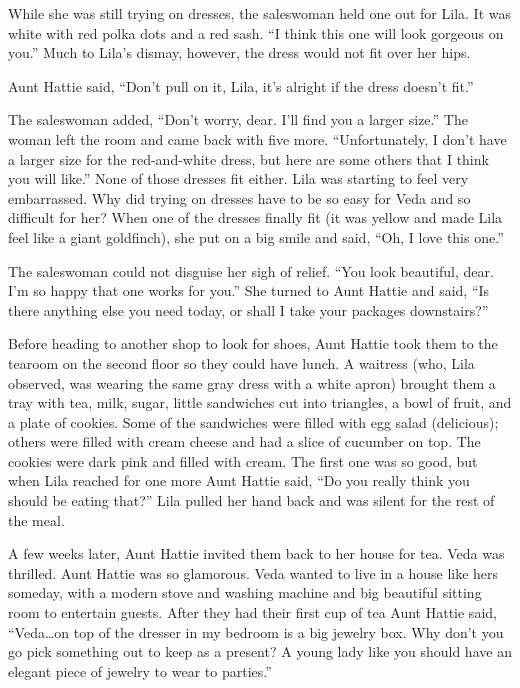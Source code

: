 \documentclass[
  american,
  letterpaper,
]{book}
\begin{document}
While she was still trying on dresses, the saleswoman held one out for
Lila. It was white with red polka dots and a red sash. ``I think this
one will look gorgeous on you.'' Much to Lila's dismay, however, the
dress would not fit over her hips.

Aunt Hattie said, ``Don't pull on it, Lila, it's alright if the dress
doesn't fit.''

The saleswoman added, ``Don't worry, dear. I'll find you a larger
size.'' The woman left the room and came back with five more.
``Unfortunately, I don't have a larger size for the red-and-white dress,
but here are some others that I think you will like.'' None of those
dresses fit either. Lila was starting to feel very embarrassed. Why did
trying on dresses have to be so easy for Veda and so difficult for her?
When one of the dresses finally fit (it was yellow and made Lila feel
like a giant goldfinch), she put on a big smile and said, ``Oh, I love
this one.''

The saleswoman could not disguise her sigh of relief. ``You look
beautiful, dear. I'm so happy that one works for you.'' She turned to
Aunt Hattie and said, ``Is there anything else you need today, or shall
I take your packages downstairs?''

Before heading to another shop to look for shoes, Aunt Hattie took them
to the tearoom on the second floor so they could have lunch. A waitress
(who, Lila observed, was wearing the same gray dress with a white apron)
brought them a tray with tea, milk, sugar, little sandwiches cut into
triangles, a bowl of fruit, and a plate of cookies. Some of the
sandwiches were filled with egg salad (delicious); others were filled
with cream cheese and had a slice of cucumber on top. The cookies were
dark pink and filled with cream. The first one was so good, but when
Lila reached for one more Aunt Hattie said, ``Do you really think you
should be eating that?'' Lila pulled her hand back and was silent for
the rest of the meal.

A few weeks later, Aunt Hattie invited them back to her house for tea.
Veda was thrilled. Aunt Hattie was so glamorous. Veda wanted to live in
a house like hers someday, with a modern stove and washing machine and
big beautiful sitting room to entertain guests. After they had their
first cup of tea Aunt Hattie said, ``Veda\ldots on top of the dresser in
my bedroom is a big jewelry box. Why don't you go pick something out to
keep as a present? A young lady like you should have an elegant piece of
jewelry to wear to parties.''
\end{document}
